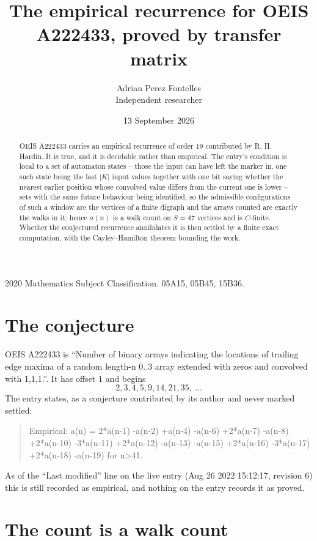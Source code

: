 \documentclass[11pt,a4paper]{article}
\title{The empirical recurrence for OEIS A222433, proved by transfer matrix}
\author{Adrian Perez Fontelles\\ \small Independent researcher}
\date{13 September 2026}
\theoremstyle{plain}
\theoremstyle{definition}
\begin{document}
\maketitle

\begin{abstract}
OEIS A222433 carries an empirical recurrence of order $19$ contributed by R. H. Hardin. It is
true, and it is decidable rather than empirical. The entry's condition is local to a set of automaton states -- those the input can have left the marker in, one such state being the last $|K|$ input values together with one bit saying whether the nearest earlier position whose convolved value differs from the current one is lower -- sets with the same future behaviour being identified, so
the admissible configurations of such a window are the vertices of a finite digraph and the
arrays counted are exactly the walks in it; hence $a(n)$ is a walk count on $S=47$ vertices
and is $C$-finite. Whether the conjectured recurrence annihilates it is then settled by a
finite exact computation, with the Cayley--Hamilton theorem bounding the work.
\end{abstract}

\noindent\small 2020 Mathematics Subject Classification. 05A15, 05B45, 15B36.\normalsize

\section{The conjecture}

OEIS A222433 is ``Number of binary arrays indicating the locations of trailing edge maxima of a random length-n 0..3 array extended with zeros and convolved with 1,1,1.''. It has offset $1$ and begins
\[
2, 3, 4, 5, 9, 14, 21, 35,\ \dots
\]
The entry states, as a conjecture contributed by its author and never marked settled:
\begin{quote}
Empirical: a(n) = 2*a(n-1) -a(n-2) +a(n-4) -a(n-6) +2*a(n-7) -a(n-8) +2*a(n-10) -3*a(n-11) +2*a(n-12) -a(n-13) -a(n-15) +2*a(n-16) -3*a(n-17) +2*a(n-18) -a(n-19) for n>41.
\end{quote}
As of the ``Last modified'' line on the live entry (Aug 26 2022 15:12:17, revision 6) this is still
recorded as empirical, and nothing on the entry records it as proved.

\section{The count is a walk count}
\end{document}
